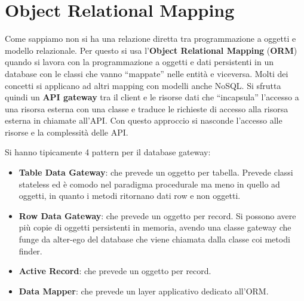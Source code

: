 \section{Object Relational Mapping}
Come sappiamo non si ha una relazione diretta tra programmazione a oggetti e
modello relazionale. Per questo si usa l'\textbf{Object Relational Mapping}
(\textbf{ORM}) quando si lavora con la programmazione a oggetti e dati persistenti
in un database con le classi che vanno “mappate” nelle entità e viceversa. Molti
dei concetti si applicano ad altri mapping con modelli anche NoSQL. Si sfrutta
quindi un \textbf{API gateway} tra il client e le risorse dati che “incapsula”
l'accesso a una risorsa esterna con una classe e traduce le richieste di accesso
alla risorsa esterna in chiamate all'API. Con questo approccio si nasconde l'accesso
alle risorse e la complessità delle API.

Si hanno tipicamente 4 pattern per il database gateway:
\begin{itemize}
    \item \textbf{Table Data Gateway}: che prevede un oggetto per tabella. Prevede
          classi stateless ed è comodo nel paradigma procedurale ma meno in quello ad
          oggetti, in quanto i metodi ritornano dati row e non oggetti.
    \item \textbf{Row Data Gateway}: che prevede un oggetto per record. Si possono
          avere più copie di oggetti persistenti in memoria, avendo una classe gateway
          che funge da alter-ego del database che viene chiamata dalla classe coi metodi finder.
    \item \textbf{Active Record}: che prevede un oggetto per record.
    \item \textbf{Data Mapper}: che prevede un layer applicativo dedicato all'ORM.
\end{itemize}
